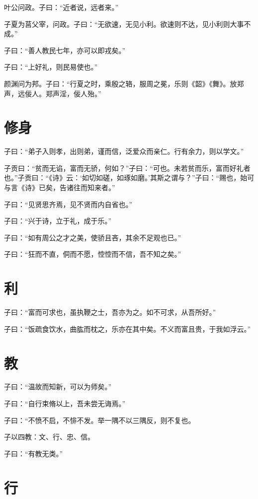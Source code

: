 \documentclass[a5paper]{ctexbook}
\begin{document}
    叶公问政。子曰：“近者说，远者来。”

    子夏为莒父宰，问政。子曰：“无欲速，无见小利。欲速则不达，见小利则大事不成。”

    子曰：“善人教民七年，亦可以即戎矣。”

    子曰：“上好礼，则民易使也。”

    颜渊问为邦。子曰：“行夏之时，乘殷之辂，服周之冕，乐则《韶》《舞》。放郑声，远佞人。郑声淫，佞人殆。”

    \chapter{修身}

    子曰：“弟子入则孝，出则弟，谨而信，泛爱众而亲仁。行有余力，则以学文。”

    子贡曰：“贫而无谄，富而无骄，何如？”子曰：“可也。未若贫而乐，富而好礼者也。”子贡曰：“《诗》云：‘如切如磋，如琢如磨。’其斯之谓与？”子曰：“赐也，始可与言《诗》已矣，告诸往而知来者。”

    子曰：“见贤思齐焉，见不贤而内自省也。”

    子曰：“兴于诗，立于礼，成于乐。”

    子曰：“如有周公之才之美，使骄且吝，其余不足观也已。”

    子曰：“狂而不直，侗而不愿，悾悾而不信，吾不知之矣。”

    \chapter{利}

    子曰：“富而可求也，虽执鞭之士，吾亦为之。如不可求，从吾所好。”

    子曰：“饭疏食饮水，曲肱而枕之，乐亦在其中矣。不义而富且贵，于我如浮云。”

    \chapter{教}

    子曰：“温故而知新，可以为师矣。”

    子曰：“自行束脩以上，吾未尝无诲焉。”

    子曰：“不愤不启，不悱不发。举一隅不以三隅反，则不复也。

    子以四教：文、行、忠、信。

    子曰：“有教无类。”

    \chapter{行}
\end{document}
